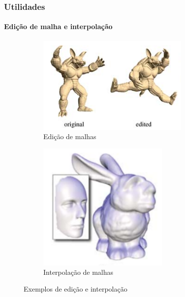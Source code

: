 \begin{frame}
\frametitle{Utilidades}
\framesubtitle{Edição de malha e interpolação}

\begin{center}
\begin{figure}
\centering
\begin{subfigure}[b]{0.49\textwidth}
	\centering
	\includegraphics[width=\textwidth]{img/edicao.png}
	\caption{Edição de malhas}
	\label{fig:edic}
\end{subfigure}
\hfill
\begin{subfigure}[b]{0.49\textwidth}
	\centering
	\includegraphics[width=0.7\textwidth]{img/interpolacao.png}
	\caption{Interpolação de malhas}
	\label{fig:interp}
\end{subfigure}

\caption{Exemplos de edição e interpolação \cite{sorkine2006}}
\end{figure}
\end{center}

\end{frame}

